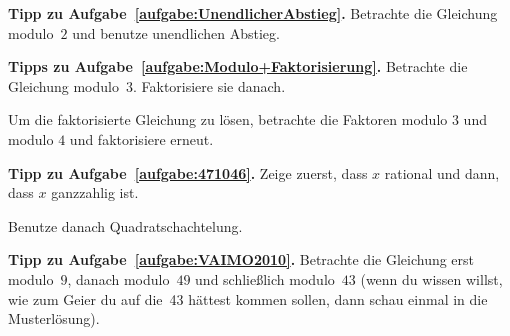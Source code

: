 \textbf{Tipp zu Aufgabe~\ref{aufgabe:UnendlicherAbstieg}.} Betrachte die Gleichung modulo~$2$ und benutze unendlichen Abstieg.

\textbf{Tipps zu Aufgabe~\ref{aufgabe:Modulo+Faktorisierung}.} Betrachte die Gleichung modulo~$3$. Faktorisiere sie danach.

Um die faktorisierte Gleichung zu lösen, betrachte die Faktoren modulo $3$ und modulo $4$ und faktorisiere erneut.


\textbf{Tipp zu Aufgabe~\ref{aufgabe:471046}.} Zeige zuerst, dass $x$ rational und dann, dass $x$ ganzzahlig ist.

Benutze danach Quadratschachtelung.


\textbf{Tipp zu Aufgabe~\ref{aufgabe:VAIMO2010}.} Betrachte die Gleichung erst modulo~$9$, danach modulo~$49$ und schließlich modulo~$43$ (wenn du wissen willst, wie zum Geier du auf die~43 hättest kommen sollen, dann schau einmal in die Musterlösung).
